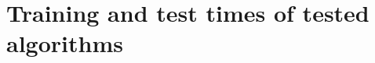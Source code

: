 \documentclass{article}
\newcommand{\Algo}[1]{\textsc{#1}}
\newcommand{\tableBefore}{-0pt}
\newcommand{\tableAfter}{-0pt}
\begin{document}
{%
%
%
%

\section{Training and test times of tested algorithms}
\label{app:running_times}

}
\end{document}
